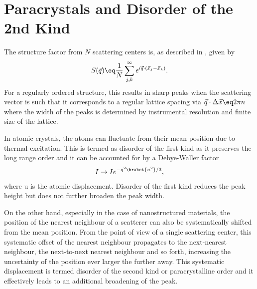 \documentclass[\main/dresen_thesis.tex]{subfiles}
\begin{document}
  \section{Paracrystals and Disorder of the 2nd Kind}
    \label{ch:appendix:calculations:paracrystal}
    The structure factor from $N$ scattering centers is, as described in , given by
    \begin{align}
      S(\vec{q}) \eq \frac{1}{N} \sum_{j, k}^{\infty} e^{i\vec{q} \cdot (\vec{x}_j - \vec{x}_k)}.
    \end{align}
    For a regularly ordered structure, this results in sharp peaks when the scattering vector is such that it corresponds to a regular lattice spacing via $\vec{q} \cdot \Delta \vec{x} \eq 2 \pi n$ where the width of the peaks is determined by instrumental resolution and finite size of the lattice.

    In atomic crystals, the atoms can fluctuate from their mean position due to thermal excitation.
    This is termed as disorder of the first kind as it preserves the long range order and it can be accounted for by a Debye-Waller factor
    \begin{align}
      I \rightarrow I e^{-q^2 \braket{u^2}/3},
    \end{align}
    where u is the atomic displacement.
    Disorder of the first kind reduces the peak height but does not further broaden the peak width.

    On the other hand, especially in the case of nanostructured materials, the position of the nearest neighbour of a scatterer can also be systematically shifted from the mean position.
    From the point of view of a single scattering center, this systematic offset of the nearest neighbour propagates to the next-nearest neighbour, the next-to-next nearest neighbour and so forth, increasing the uncertainty of the position ever larger the further away.
    This systematic displacement is termed disorder of the second kind or paracrystalline order and it effectively leads to an additional broadening of the peak.
\end{document}
